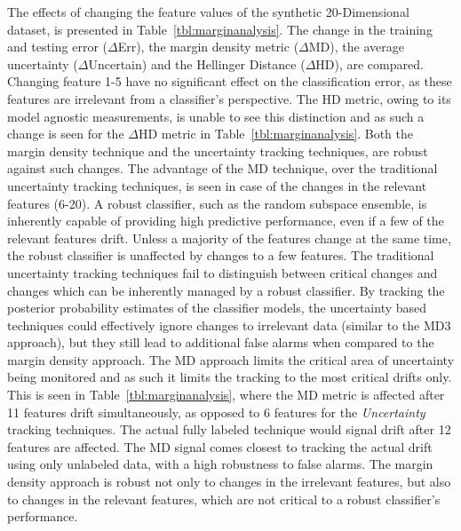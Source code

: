 \documentclass[authoryear,3p,times,twocolumn]{elsarticle}
\begin{document}
The effects of changing the feature values of the synthetic 20-Dimensional dataset, is presented in Table~\ref{tbl:marginanalysis}. The change in the training and testing error ($\Delta$Err), the margin density metric ($\Delta$MD), the average uncertainty  ($\Delta$Uncertain) and the Hellinger Distance ($\Delta$HD), are compared. Changing feature 1-5 have no significant effect on the classification error, as these features are irrelevant from a classifier's perspective. The HD metric, owing to its model agnostic measurements, is unable to see this distinction and as such a change is seen for the $\Delta$HD metric in Table~\ref{tbl:marginanalysis}. Both the margin density technique and the uncertainty tracking techniques, are robust against such changes. The advantage of the MD technique, over the traditional uncertainty tracking techniques, is seen in case of the changes in the relevant features (6-20). A robust classifier, such as the random subspace ensemble, is inherently capable of providing high predictive performance, even if a few of the relevant features drift. Unless a majority of the features change at the same time, the robust classifier is unaffected by changes to a few features. The traditional uncertainty tracking techniques fail to distinguish between critical changes and changes which can be inherently managed by a robust classifier. By tracking the posterior probability estimates of the classifier models, the uncertainty based techniques could effectively ignore changes to irrelevant data (similar to the MD3 approach), but they still lead to additional false alarms when compared to the margin density approach. The MD approach limits the critical area of uncertainty being monitored and as such it limits the tracking to the most critical drifts only. This is seen in Table~\ref{tbl:marginanalysis}, where the MD metric is affected after 11 features drift simultaneously, as opposed to 6 features for the \textit{Uncertainty} tracking techniques. The actual fully labeled technique would signal drift after 12 features are affected. The MD signal comes closest to tracking the actual drift using only unlabeled data, with a high robustness to false alarms. The margin density approach is robust not only to changes in the irrelevant features, but also to changes in the relevant features, which are not critical to a robust classifier's performance. 
\end{document}
